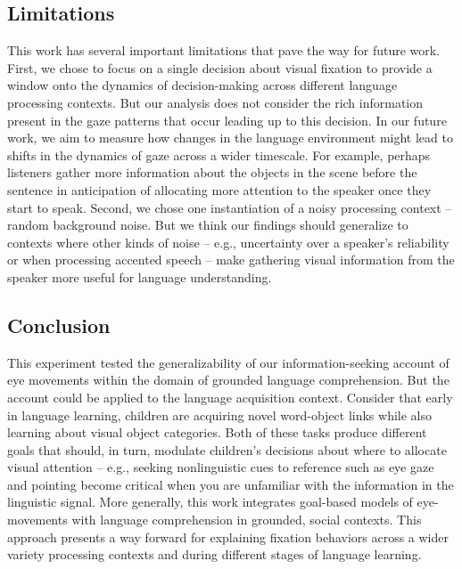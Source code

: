 \documentclass[english,floatsintext,man]{apa6}
\begin{document}
\hypertarget{limitations}{%
\subsection{Limitations}\label{limitations}}

This work has several important limitations that pave the way for future
work. First, we chose to focus on a single decision about visual
fixation to provide a window onto the dynamics of decision-making across
different language processing contexts. But our analysis does not
consider the rich information present in the gaze patterns that occur
leading up to this decision. In our future work, we aim to measure how
changes in the language environment might lead to shifts in the dynamics
of gaze across a wider timescale. For example, perhaps listeners gather
more information about the objects in the scene before the sentence in
anticipation of allocating more attention to the speaker once they start
to speak. Second, we chose one instantiation of a noisy processing
context -- random background noise. But we think our findings should
generalize to contexts where other kinds of noise -- e.g., uncertainty
over a speaker's reliability or when processing accented speech -- make
gathering visual information from the speaker more useful for language
understanding.

\hypertarget{conclusion}{%
\subsection{Conclusion}\label{conclusion}}

This experiment tested the generalizability of our information-seeking
account of eye movements within the domain of grounded language
comprehension. But the account could be applied to the language
acquisition context. Consider that early in language learning, children
are acquiring novel word-object links while also learning about visual
object categories. Both of these tasks produce different goals that
should, in turn, modulate children's decisions about where to allocate
visual attention -- e.g., seeking nonlinguistic cues to reference such
as eye gaze and pointing become critical when you are unfamiliar with
the information in the linguistic signal. More generally, this work
integrates goal-based models of eye-movements with language
comprehension in grounded, social contexts. This approach presents a way
forward for explaining fixation behaviors across a wider variety
processing contexts and during different stages of language learning.
\end{document}
